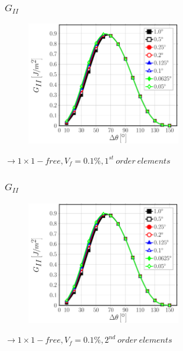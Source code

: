 \documentclass[first,firstsupp,lastsupp,last,hyperref,table]{ETHclass}
\begin{document}
\begin{frame}
\frametitle{\vspace{0.25cm}\small $G_{II}$}
\vspace{-.75cm}
\centering
\begin{figure}
\centering
\includegraphics[width=0.6\textwidth]{Vf0_1-free-1st-GII.pdf}
\end{figure}
$\rightarrow 1\times1-free, V_{f}=0.1\%, 1^{st}\ order\ elements$ 
\end{frame}

\addtocounter{framenumber}{-1}

\begin{frame}
\frametitle{\vspace{0.25cm}\small $G_{II}$}
\vspace{-.75cm}
\centering
\begin{figure}
\centering
\includegraphics[width=0.6\textwidth]{Vf0_1-free-2nd-GII.pdf}
\end{figure}
$\rightarrow 1\times1-free, V_{f}=0.1\%, 2^{nd}\ order\ elements$ 
\end{frame}

\addtocounter{framenumber}{-1}
\end{document}
